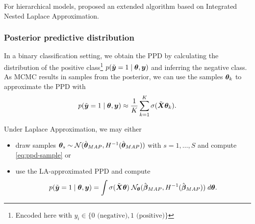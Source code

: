 For hierarchical models, \citet{rue_approximate_2009} proposed an extended algorithm based on Integrated Nested Laplace Approximation.

\subsubsection*{Posterior predictive distribution}

In a binary classification setting, we obtain the PPD by calculating the distribution of the positive class\footnote{
    Encoded here with $y_i \in \{0 \text{ (negative)}, 1 \text{ (positive)}\}$
} $p(\tilde{\bm{y}} = 1 \mid \bm{\theta}, \bm{y})$ and inferring the negative class.\\

As MCMC results in samples from the posterior, we can use the samples $\bm{\theta}_k$ to approximate the PPD with
\begin{equation}\label{eq:ppd-sample}
    p(\tilde{\bm{y}} = 1 \mid \bm{\theta}, \bm{y}) \approx \frac{1}{K} \sum_{k=1}^{K} \sigma(\tilde{\bm{X}} \bm{\theta}_k).
\end{equation}

Under Laplace Approximation, we may either
\begin{itemize}
    \item draw samples $\bm{\theta}_s \sim \mathcal{N}(\hat{\bm{\theta}}_{MAP}, H^{-1}(\hat{\bm{\theta}}_{MAP}))$ with $s = 1, \dots, S$ and compute \autoref{eq:ppd-sample} or
    \item use the LA-approximated PPD and compute
    \begin{equation*}
        p(\tilde{\bm{y}} = 1 \mid \bm{\theta}, \bm{y}) = \int \sigma(\tilde{\bm{X}} \bm{\theta}) \; \mathcal{N}_{\bm{\theta}}(\hat{\bm{\beta}}_{MAP}, H^{-1} (\hat{\bm{\beta}}_{MAP})) \; d \bm{\theta}.
    \end{equation*}
\end{itemize}
